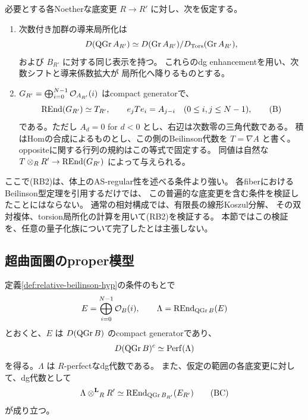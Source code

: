 \begin{definition}[本節の相対Beilinson仮定]\label{def:relative-beilinson-hyp}
 必要とする各Noetherな底変更 \(R\to R'\) に対し、次を仮定する。
 \begin{enumerate}[label=(RB\arabic*)]
 \item 次数付き加群の導来局所化は
 \[
 D(\operatorname{QGr} A_{R'})\simeq
 D(\operatorname{Gr}A_{R'})/
 D_{\operatorname{Tors}}(\operatorname{Gr}A_{R'}),
 \]
 および \(B_{R'}\) に対する同じ表示を持つ。
 これらのdg enhancementを用い、次数シフトと導来係数拡大が
 局所化へ降りるものとする。
 \item \(G_{R'}=\bigoplus_{i=0}^{N-1}\mathcal O_{A_{R'}}(i)\) はcompact generatorで、
 \[
 \operatorname{REnd}(G_{R'})\simeq T_{R'},\qquad
 e_jTe_i=A_{j-i}\quad(0\le i,j\le N-1),
 \tag{B}\label{eq:relative-beilinson-algebra}
 \]
 である。ただし \(A_d=0\) for \(d<0\) とし、右辺は次数零の三角代数である。
 積はHomの合成によるものとし、この側のBeilinson代数を \(T=\nabla A\) と書く。
 oppositeに関する行列の規約はこの等式で固定する。
 同値は自然な \(T\otimes_RR'\to\operatorname{REnd}(G_{R'})\) によって与えられる。
 \end{enumerate}
\end{definition}

ここで(RB2)は、体上のAS-regular性を述べる条件より強い。
各fiberにおけるBeilinson型定理を引用するだけでは、
この普遍的な底変更を含む条件を検証したことにはならない。
通常の相対構成では、有限長の線形Koszul分解、
その双対複体、torsion局所化の計算を用いて(RB2)を検証する。
本節ではこの検証を、任意の量子化族について完了したとは主張しない。

\subsection{超曲面圏のproper模型}

\begin{proposition}[相対proper模型]\label{prop:relative-proper-model}
 定義\ref{def:relative-beilinson-hyp}の条件のもとで
 \[
 E=\bigoplus_{i=0}^{N-1}\mathcal O_B(i),\qquad
 \Lambda=\operatorname{REnd}_{\operatorname{QGr} B}(E)
 \]
 とおくと、\(E\) は \(D(\operatorname{QGr} B)\) のcompact generatorであり、
 \[
 D(\operatorname{QGr} B)^c\simeq\operatorname{Perf}(\Lambda)
 \]
 を得る。\(\Lambda\) は \(R\)-perfectなdg代数である。
 また、仮定の範囲の各底変更に対して、dg代数として
 \[
 \Lambda\mathbin{\otimes^{\mathbf L}}_RR'\simeq
 \operatorname{REnd}_{\operatorname{QGr} B_{R'}}(E_{R'})
 \tag{BC}\label{eq:relative-proper-basechange}
 \]
 が成り立つ。
\end{proposition}

